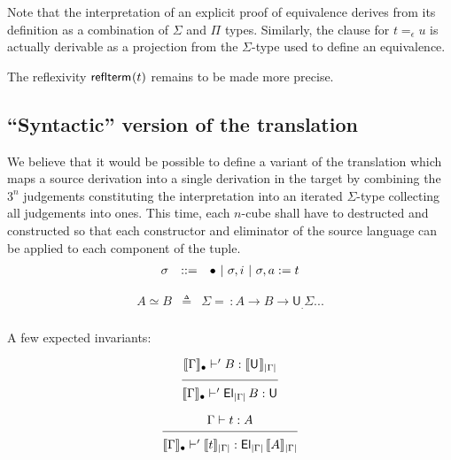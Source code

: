 \documentclass{article}
\newcommand{\sort}[1]{\mathsf{U}_{#1}}
\newcommand{\defeq}{\triangleq}
\begin{document}
Note that the interpretation of an explicit proof of equivalence
derives from its definition as a combination of $\Sigma$ and $\Pi$
types. Similarly, the clause for $t =_\epsilon u$ is actually derivable
as a projection from the $\Sigma$-type used to define an equivalence.

The reflexivity $\mathsf{reflterm}_{}(t)$ remains to be made more precise.

\subsection{``Syntactic'' version of the translation}

We believe that it would be possible to define a variant of the
translation which maps a source derivation into a single derivation in
the target by combining the $3^n$ judgements constituting the
interpretation into an iterated $\Sigma$-type collecting all
judgements into ones. This time, each $n$-cube shall have to
destructed and constructed so that each constructor and eliminator of
the source language can be applied to each component of the tuple.
\fi %
\iffalse
$$
\begin{array}{lcl}
\sigma & ::= & \bullet ~|~ \sigma, i ~|~ \sigma, a:=t\\
\end{array}
$$

$$
\begin{array}{lcl}
A \simeq B & \defeq & \Sigma =\, : A \rightarrow B \rightarrow \sort. \Sigma ...\\
\end{array}
$$

A few expected invariants:

$$
\seq{\semctx{\emptysigma}{\Gamma} \vdash' B : \semnew{|\Gamma|}{\sort{}}}
    {\semctx{\emptysigma}{\Gamma} \vdash' \elt{|\Gamma|}{B} : \sort{}}
$$

$$
\seq{\Gamma \vdash t : A}
    {\semctx{\emptysigma}{\Gamma} \vdash' \semnew{|\Gamma|}{t} : \elt{|\Gamma|}{\semnew{|\Gamma|}{A}}}
$$
\end{document}

